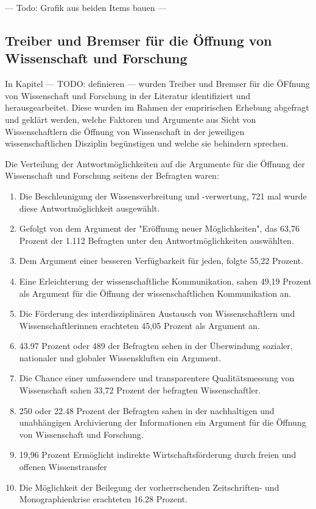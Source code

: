 --- Todo: Grafik aus beiden Items bauen ---

\subsection{Treiber und Bremser für die Öffnung von Wissenschaft und Forschung}

In Kapitel --- TODO: definieren --- wurden Treiber und Bremser für die ÖFfnung von Wissenschaft und Forschung in der Literatur identifiziert und herausgearbeitet. Diese wurden im Rahmen der empririschen Erhebung abgefragt und geklärt werden, welche Faktoren und Argumente aus Sicht von Wissenschaftlern die Öffnung von Wissenschaft in der jeweiligen wissenschaftlichen Disziplin begünstigen und welche sie behindern sprechen. 

Die Verteilung der Antwortmöglichkeiten auf die Argumente für die Öffnung der Wissenschaft und Forschung seitens der Befragten waren:
\begin{enumerate}
\item Die Beschleunigung der Wissensverbreitung und -verwertung, 721 mal wurde diese Antwortmöglichkeit ausgewählt.
\item Gefolgt von dem Argument der "Eröffnung neuer Möglichkeiten", das 63,76 Prozent der 1.112 Befragten unter den Antwortmöglichkeiten auswählten.
\item Dem Argument einer besseren Verfügbarkeit für jeden, folgte 55,22 Prozent.
\item Eine Erleichterung der wissenschaftliche Kommunikation, sahen 49,19 Prozent als Argument für die Öffnung der wissenschaftlichen Kommunikation an.
\item Die Förderung des interdisziplinären Austausch von Wissenschaftlern und Wissenschaftlerinnen erachteten 45,05 Prozent als Argument an. 
\item 43.97 Prozent oder 489 der Befragten sehen in der Überwindung sozialer, nationaler und globaler Wissenskluften ein Argument.
\item Die Chance einer umfassendere und transparentere Qualitätsmessung von Wissenschaft sahen 33,72 Prozent der befragten Wissenschaftler.
\item 250 oder 22.48 Prozent der Befragten sahen in der nachhaltigen und unabhängigen Archivierung der Informationen ein Argument für die Öffnung von Wissenschaft und Forschung.
\item 19,96 Prozent Ermöglicht indirekte Wirtschaftsförderung durch freien und offenen Wissenstransfer
\item Die Möglichkeit der Beilegung der vorherrschenden Zeitschriften- und Monographienkrise erachteten 16.28 Prozent.
\end{enumerate}

